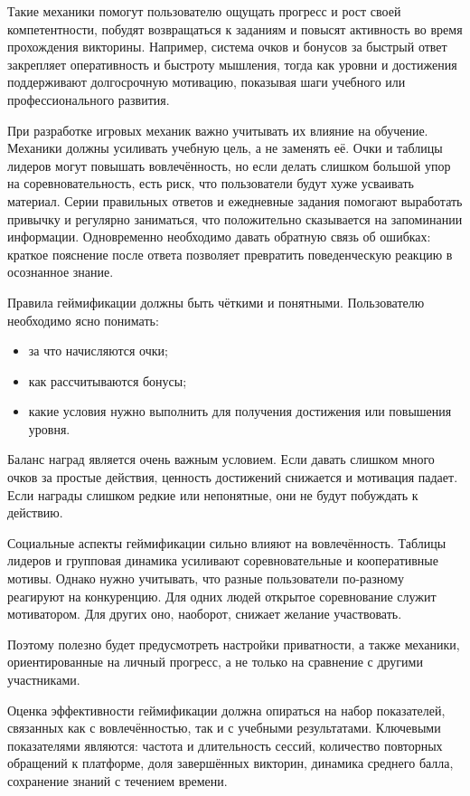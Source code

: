 \documentclass[14pt,a4paper]{extreport}
\begin{document}
Такие механики помогут пользователю ощущать прогресс и рост своей компетентности, побудят возвращаться к заданиям и повысят активность во время прохождения викторины. Например, система очков и бонусов за быстрый ответ закрепляет оперативность и быстроту мышления, тогда как уровни и достижения поддерживают долгосрочную мотивацию, показывая шаги учебного или профессионального развития.

При разработке игровых механик важно учитывать их влияние на обучение. Механики должны усиливать учебную цель, а не заменять её. Очки и таблицы лидеров могут повышать вовлечённость, но если делать слишком большой упор на соревновательность, есть риск, что пользователи будут хуже усваивать материал. Серии правильных ответов и ежедневные задания помогают выработать привычку и регулярно заниматься, что положительно сказывается на запоминании информации. Одновременно необходимо давать обратную связь об ошибках: краткое пояснение после ответа позволяет превратить поведенческую реакцию в осознанное знание.

Правила геймификации должны быть чёткими и понятными. Пользователю необходимо ясно понимать:
\begin{itemize}
    \item за что начисляются очки;
    \item как рассчитываются бонусы;
    \item какие условия нужно выполнить для получения достижения или повышения уровня.
\end{itemize}

Баланс наград является очень важным условием. Если давать слишком много очков за простые действия, ценность достижений снижается и мотивация падает. Если награды слишком редкие или непонятные, они не будут побуждать к действию.

Социальные аспекты геймификации сильно влияют на вовлечённость. Таблицы лидеров и групповая динамика усиливают соревновательные и кооперативные мотивы. Однако нужно учитывать, что разные пользователи по-разному реагируют на конкуренцию. Для одних людей открытое соревнование служит мотиватором. Для других оно, наоборот, снижает желание участвовать.

Поэтому полезно будет предусмотреть настройки приватности, а также механики, ориентированные на личный прогресс, а не только на сравнение с другими участниками.

Оценка эффективности геймификации должна опираться на набор показателей, связанных как с вовлечённостью, так и с учебными результатами. Ключевыми показателями являются: частота и длительность сессий, количество повторных обращений к платформе, доля завершённых викторин, динамика среднего балла, сохранение знаний с течением времени.
\end{document}

